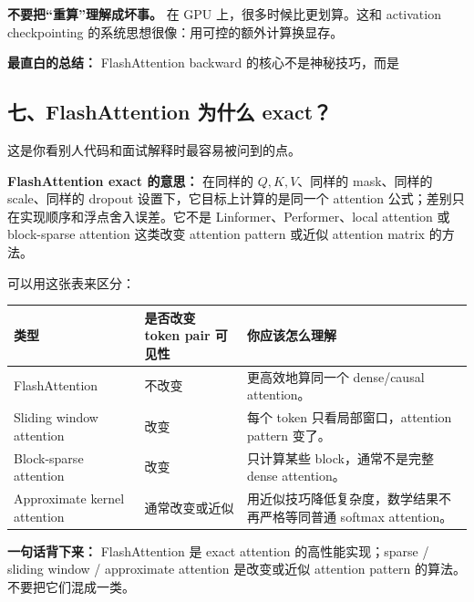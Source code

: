 \begin{warnbox}
\textbf{不要把“重算”理解成坏事。} 在 GPU 上，很多时候比更划算。这和 activation checkpointing 的系统思想很像：用可控的额外计算换显存。
\end{warnbox}

\begin{summarybox}
\textbf{最直白的总结：} FlashAttention backward 的核心不是神秘技巧，而是
\end{summarybox}

\subsection{七、FlashAttention 为什么 exact？}

这是你看别人代码和面试解释时最容易被问到的点。

\begin{conceptbox}
\textbf{FlashAttention exact 的意思：} 在同样的 $Q,K,V$、同样的 mask、同样的 scale、同样的 dropout 设置下，它目标上计算的是同一个 attention 公式；差别只在实现顺序和浮点舍入误差。它不是 Linformer、Performer、local attention 或 block-sparse attention 这类改变 attention pattern 或近似 attention matrix 的方法。
\end{conceptbox}

可以用这张表来区分：

\begin{center}
{\small
\begin{tabular}{p{3.3cm}p{4.4cm}p{5.2cm}}
\hline
\textbf{类型} & \textbf{是否改变 token pair 可见性} & \textbf{你应该怎么理解} \\
\hline
FlashAttention & 不改变 & 更高效地算同一个 dense/causal attention。 \\
Sliding window attention & 改变 & 每个 token 只看局部窗口，attention pattern 变了。 \\
Block-sparse attention & 改变 & 只计算某些 block，通常不是完整 dense attention。 \\
Approximate kernel attention & 通常改变或近似 & 用近似技巧降低复杂度，数学结果不再严格等同普通 softmax attention。 \\
\hline
\end{tabular}
}
\end{center}

\begin{summarybox}
\textbf{一句话背下来：} FlashAttention 是 exact attention 的高性能实现；sparse / sliding window / approximate attention 是改变或近似 attention pattern 的算法。不要把它们混成一类。
\end{summarybox}


